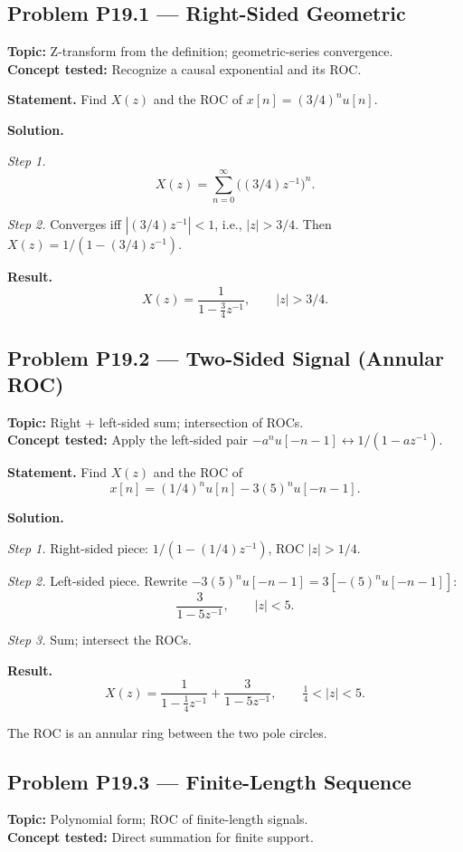 \documentclass[11pt]{article}
\begin{document}
\subsection{Problem P19.1 --- Right-Sided Geometric}
\textbf{Topic:} Z-transform from the definition; geometric-series convergence.\\
\textbf{Concept tested:} Recognize a causal exponential and its ROC.

\textbf{Statement.} Find $X(z)$ and the ROC of $x[n] = (3/4)^{n}u[n]$.

\textbf{Solution.}

\textit{Step 1.}
\[
X(z) = \sum_{n=0}^{\infty}\!\bigl((3/4)z^{-1}\bigr)^{n}.
\]

\textit{Step 2.} Converges iff $|(3/4)z^{-1}|<1$, i.e., $|z|>3/4$. Then
$X(z) = 1/(1-(3/4)z^{-1})$.

\textbf{Result.}
\[
\boxed{\,X(z) = \frac{1}{1-\tfrac{3}{4}z^{-1}},\qquad |z|>3/4.\,}
\]

\subsection{Problem P19.2 --- Two-Sided Signal (Annular ROC)}
\textbf{Topic:} Right + left-sided sum; intersection of ROCs.\\
\textbf{Concept tested:} Apply the left-sided pair $-a^{n}u[-n-1]\leftrightarrow 1/(1-az^{-1})$.

\textbf{Statement.} Find $X(z)$ and the ROC of
\[
x[n] = (1/4)^{n}u[n] - 3(5)^{n}u[-n-1].
\]

\textbf{Solution.}

\textit{Step 1.} Right-sided piece: $1/(1-(1/4)z^{-1})$, ROC $|z|>1/4$.

\textit{Step 2.} Left-sided piece. Rewrite $-3(5)^{n}u[-n-1] = 3[-(5)^{n}u[-n-1]]$:
\[
\frac{3}{1-5z^{-1}},\qquad |z|<5.
\]

\textit{Step 3.} Sum; intersect the ROCs.

\textbf{Result.}
\[
\boxed{\,X(z) = \frac{1}{1-\tfrac{1}{4}z^{-1}} + \frac{3}{1-5z^{-1}},\qquad \tfrac{1}{4}<|z|<5.\,}
\]

The ROC is an annular ring between the two pole circles.

\subsection{Problem P19.3 --- Finite-Length Sequence}
\textbf{Topic:} Polynomial form; ROC of finite-length signals.\\
\textbf{Concept tested:} Direct summation for finite support.
\end{document}
